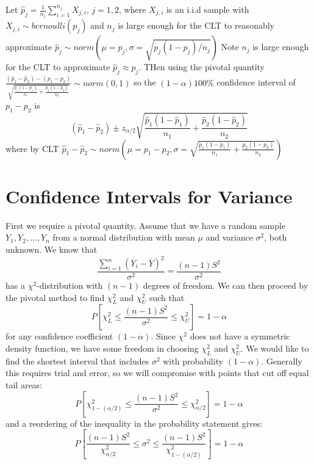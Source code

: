 \documentclass[12pt, a4paper, twoside, openright, titlepage]{book}
\begin{document}
\begin{prop}{}{}
    Let $\hat{p}_j = \frac{1}{n_j}\sum_{i=1}^{n_j}X_{j,i}$, $j = 1,2$, where $X_{j,i}$ is an i.i.d sample with $X_{j,i} \sim bernoulli(p_j)$ and $n_j$ is large enough for the CLT to reasonably approximate $\hat{p}_j\sim norm(\mu = p_j,\sigma = \sqrt{p_j(1-p_j)/n_j})$ Note $n_j$ is large enough for the CLT to approximate $\hat{p}_j \approx p_j$. THen using the pivotal quantity $\frac{(\hat{p}_1-\hat{p}_2)-(p_1-p_2)}{\sqrt{\frac{\hat{p}_1(1-\hat{p}_1)}{n_1} + \frac{\hat{p}_2(1-\hat{p}_2)}{n_2}}} \sim norm(0,1)$ so the $(1-\alpha)100\%$ confidence interval of $p_1-p_2$ is \begin{equation*}
        (\hat{p}_1-\hat{p}_2) \pm z_{\alpha/2}\sqrt{\frac{\hat{p}_1(1-\hat{p}_1)}{n_1} + \frac{\hat{p}_2(1-\hat{p}_2)}{n_2}}
    \end{equation*}
    where by CLT $\hat{p}_1-\hat{p}_2 \sim norm(\mu = p_1-p_2, \sigma = \sqrt{\frac{p_1(1-p_1)}{n_1} + \frac{p_2(1-p_2)}{n_2}})$
\end{prop}







\section{\textsection Confidence Intervals for Variance}

First we require a pivotal quantity. Assume that we have a random sample $Y_1,Y_2,...,Y_n$ from a normal distribution with mean $\mu$ and variance $\sigma^2$, both unknown. We know that \begin{equation*}
    \frac{\sum_{i=1}^n(Y_i-\overline{Y})^2}{\sigma^2} = \frac{(n-1)S^2}{\sigma^2}
\end{equation*}
has a $\chi^2$-distribution with $(n-1)$ degrees of freedom. We can then proceed by the pivotal method to find $\chi^2_L$ and $\chi^2_U$ such that \begin{equation*}
    P\left[\chi_L^2 \leq \frac{(n-1)S^2}{\sigma^2}\leq \chi_U^2\right] = 1-\alpha
\end{equation*}
for any confidence coefficient $(1-\alpha)$. Since $\chi^2$ does not have a symmetric density function, we have some freedom in choosing $\chi^2_L$ and $\chi^2_U$. We would like to find the shortest interval that includes $\sigma^2$ with probability $(1-\alpha)$. Generally this requires trial and error, so we will compromise with points that cut off equal tail areas: \begin{equation*}
    P\left[\chi_{1-(\alpha/2)}^2 \leq \frac{(n-1)S^2}{\sigma^2}\leq \chi_{\alpha/2}^2\right] = 1-\alpha
\end{equation*}
and a reordering of the inequality in the probability statement gives: \begin{equation*}
    P\left[\frac{(n-1)S^2}{\chi^2_{\alpha/2}} \leq \sigma^2 \leq \frac{(n-1)S^2}{\chi^2_{1-(\alpha/2)}}\right] = 1-\alpha
\end{equation*}
\end{document}
